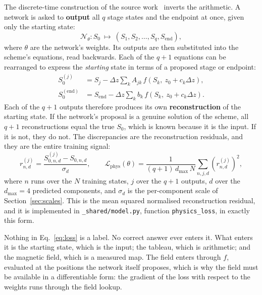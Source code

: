 \documentclass[11pt,a4paper]{article}
\begin{document}
The discrete-time construction of the source work~\cite{raissi2019} inverts the
arithmetic. A network is asked to \textbf{output} all $q$ stage states and the
endpoint at once, given only the starting state:
%
\begin{equation}
  \mathcal{N}_\theta : S_0 \ \longmapsto\
  \left(S_1, S_2, \dots, S_q, S_{\mathrm{end}}\right),
  \label{eq:net}
\end{equation}
%
where $\theta$ are the network's weights. Its outputs are then substituted into
the scheme's equations, read backwards. Each of the $q + 1$ equations can be
rearranged to express the \emph{starting} state in terms of a proposed stage or
endpoint:
%
\begin{align}
  S_0^{(j)} &= S_j - \Delta z \sum_{k} A_{jk}\,
                f\!\left(S_k,\ z_0 + c_k \Delta z\right),
  \label{eq:recon-stage}\\
  S_0^{(\mathrm{end})} &= S_{\mathrm{end}} - \Delta z \sum_{k} b_k\,
                f\!\left(S_k,\ z_0 + c_k \Delta z\right).
  \label{eq:recon-end}
\end{align}
%
Each of the $q+1$ outputs therefore produces its own \textbf{reconstruction} of
the starting state. If the network's proposal is a genuine solution of the
scheme, all $q + 1$ reconstructions equal the true $S_0$, which is known because
it is the input. If it is not, they do not. The discrepancies are the
reconstruction residuals, and they are the entire training signal:
%
\begin{equation}
  r^{(j)}_{n,d} = \frac{S_{0,n,d}^{(j)} - S_{0,n,d}}{\sigma_d},
  \qquad
  \mathcal{L}_{\mathrm{phys}}(\theta)
    = \frac{1}{(q+1)\,d_{\max}\,N}
      \sum_{n,j,d} \left(r^{(j)}_{n,d}\right)^2,
  \label{eq:loss}
\end{equation}
%
where $n$ runs over the $N$ training states, $j$ over the $q+1$ outputs, $d$
over the $d_{\max} = 4$ predicted components, and $\sigma_d$ is the
per-component scale of Section~\ref{sec:scales}. This is the mean squared
normalised reconstruction residual, and it is implemented in
\texttt{\_shared/model.py}, function \texttt{physics\_loss}, in exactly this
form.

Nothing in Eq.~\eqref{eq:loss} is a label. No correct answer ever enters it.
What enters it is the starting state, which is the input; the tableau, which is
arithmetic; and the magnetic field, which is a measured map. The field enters
through $f$, evaluated at the positions the network itself proposes, which is
why the field must be available in a differentiable form: the gradient of the
loss with respect to the weights runs through the field lookup.
\end{document}
